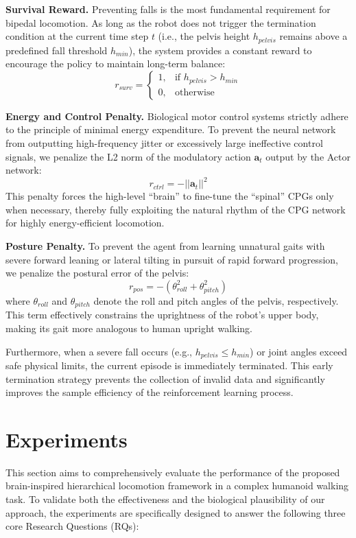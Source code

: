 \documentclass[lettersize,journal]{IEEEtran}
\begin{document}
\textbf{Survival Reward.}
Preventing falls is the most fundamental requirement for bipedal locomotion. 
As long as the robot does not trigger the termination condition at the current time step $t$ (i.e., the pelvis height $h_{pelvis}$ remains above a predefined fall threshold $h_{min}$), the system provides a constant reward to encourage the policy to maintain long-term balance:
\begin{equation}
    r_{surv} = 
    \begin{cases} 
      1, & \text{if } h_{pelvis} > h_{min} \\
      0, & \text{otherwise}
    \end{cases}
\end{equation}

\textbf{Energy and Control Penalty.}
Biological motor control systems strictly adhere to the principle of minimal energy expenditure. 
To prevent the neural network from outputting high-frequency jitter or excessively large ineffective control signals, we penalize the L2 norm of the modulatory action $\mathbf{a}_t$ output by the Actor network:
\begin{equation}
    r_{ctrl} = - ||\mathbf{a}_t||^2
\end{equation}
This penalty forces the high-level ``brain'' to fine-tune the ``spinal'' CPGs only when necessary, thereby fully exploiting the natural rhythm of the CPG network for highly energy-efficient locomotion.

\textbf{Posture Penalty.}
To prevent the agent from learning unnatural gaits with severe forward leaning or lateral tilting in pursuit of rapid forward progression, we penalize the postural error of the pelvis:
\begin{equation}
    r_{pos} = - \left( \theta_{roll}^2 + \theta_{pitch}^2 \right)
\end{equation}
where $\theta_{roll}$ and $\theta_{pitch}$ denote the roll and pitch angles of the pelvis, respectively. 
This term effectively constrains the uprightness of the robot's upper body, making its gait more analogous to human upright walking.

Furthermore, when a severe fall occurs (e.g., $h_{pelvis} \leq h_{min}$) or joint angles exceed safe physical limits, the current episode is immediately terminated. 
This early termination strategy prevents the collection of invalid data and significantly improves the sample efficiency of the reinforcement learning process.

\section{Experiments}
This section aims to comprehensively evaluate the performance of the proposed brain-inspired hierarchical locomotion framework in a complex humanoid walking task. To validate both the effectiveness and the biological plausibility of our approach, the experiments are specifically designed to answer the following three core Research Questions (RQs):
\end{document}
